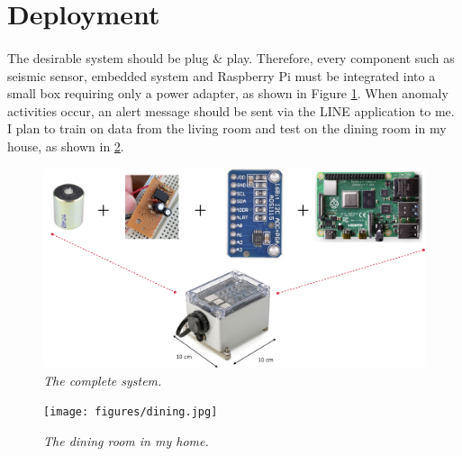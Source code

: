 \section{Deployment}
\paragraph{}
The desirable system should be plug \& play. Therefore, every component such as seismic sensor, embedded system and Raspberry Pi must be integrated into a small box requiring only a power adapter, as shown in Figure \ref{fig:application}. When anomaly activities occur, an alert message should be sent via the LINE application to me. I plan to train on data from the living room and test on the dining room in my house, as shown in \ref{fig:dining}.

\begin{figure}[H]
  \centering
  \caption[The complete application.]{\emph{The complete system.}} \label{fig:application}
  \includegraphics[scale = 0.14]{figures/application.jpg}  
\end{figure}

\begin{figure}[H]
  \centering
  \caption[The dining room in my home.]{\emph{The dining room in my home.}} \label{fig:dining}
  \texttt{[image: figures/dining.jpg]}  
\end{figure}

\FloatBarrier
